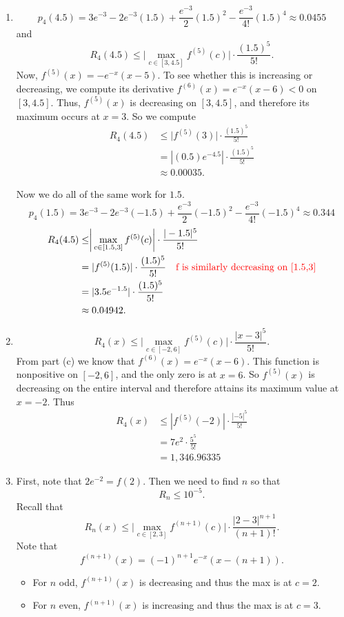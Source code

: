 \documentclass[handout]{ximera}
\begin{document}
\begin{problem}
\begin{freeResponse}
\begin{enumerate}
	\item  
		\[
		p_4(4.5) = 3e^{-3} - 2e^{-3}(1.5) + \frac{e^{-3}}{2}(1.5)^2 - \frac{e^{-3}}{4!}(1.5)^4 \approx 0.0455
		\]
	and
		\[
		R_4(4.5) \leq \biggr| \max_{c \in [3,4.5]} f^{(5)}(c) \biggr| \cdot \frac{(1.5)^5}{5!}.
		\]
	Now, $f^{(5)}(x) = -e^{-x}(x-5)$.  
	To see whether this is increasing or decreasing, we compute its derivative $f^{(6)}(x) = e^{-x}(x-6) < 0$ on $[3,4.5]$.  
	Thus, $f^{(5)}(x)$ is decreasing on $[3,4.5]$, and therefore its maximum occurs at $x=3$.  
	So we compute
		\begin{align*}
		R_4(4.5) &\leq \biggr| f^{(5)}(3) \biggr| \cdot \frac{(1.5)^5}{5!}  \\
		&= |(0.5)e^{-4.5}| \cdot \frac{(1.5)^5}{5!}  \\
		&\approx 0.00035.
		\end{align*}
		
	Now we do all of the same work for $1.5$.  
		\[
		p_4(1.5) = 3e^{-3} - 2e^{-3}(-1.5) + \frac{e^{-3}}{2}(-1.5)^2 - \frac{e^{-3}}{4!}(-1.5)^4 \approx 0.344
		\]
		\begin{align*}
		R_4(4.5) &\leq \biggr| \max_{c \in [1.5,3]} f^{(5)}(c) \biggr| \cdot \frac{|-1.5|^5}{5!} \\
		&= | f^{(5)}(1.5) | \cdot \frac{(1.5)^5}{5!}  \quad {\color{red}\text{f is similarly decreasing on [1.5,3]}}\\
		&= | 3.5 e^{-1.5} |  \cdot \frac{(1.5)^5}{5!}  \\
		&\approx 0.04942.
		\end{align*}
	
	\item  
		\[
		R_4(x) \leq \biggr| \max_{c \in [-2,6]} f^{(5)}(c) \biggr| \cdot \frac{|x-3|^5}{5!}.
		\]
	From part (c) we know that $f^{(6)}(x) = e^{-x}(x-6)$.  
	This function is nonpositive on $[-2,6]$, and the only zero is at $x=6$.  
	So $f^{(5)}(x)$ is decreasing on the entire interval and therefore attains its maximum value at $x=-2$.  
	Thus
		\begin{align*}
		R_4(x) &\leq |f^{(5)}(-2)| \cdot \frac{|-5|^5}{5!}  \\
		&= 7e^2 \cdot \frac{5^5}{5!}  \\
		&= 1,346.96335
		\end{align*}
	
	\item  First, note that $2e^{-2} = f(2)$.  
	Then we need to find $n$ so that
		\[
		R_n \leq 10^{-5}.
		\]
	Recall that
		\[
		R_n(x) \leq \biggr| \max_{c \in [2,3]} f^{(n+1)}(c) \biggr| \cdot \frac{|2-3|^{n+1}}{(n+1)!}.
		\]
	Note that
		\[
		f^{(n+1)}(x) = (-1)^{n+1} e^{-x} (x - (n+1)).
		\]
	\begin{itemize}
	\item For $n$ odd, $f^{(n+1)}(x)$ is decreasing and thus the max is at $c=2$.
	\item For $n$ even, $f^{(n+1)}(x)$ is increasing and thus the max is at $c=3$.  
	\end{itemize}
	

\end{enumerate}
\end{freeResponse}
\end{problem}
\end{document}
